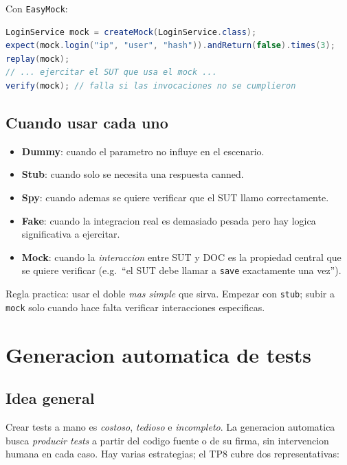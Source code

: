 \documentclass[12pt,a4paper]{article}
\begin{document}
\begin{ejemplobox}
Con \texttt{EasyMock}:
\begin{lstlisting}[style=codestyle,language=Java]
LoginService mock = createMock(LoginService.class);
expect(mock.login("ip", "user", "hash")).andReturn(false).times(3);
replay(mock);
// ... ejercitar el SUT que usa el mock ...
verify(mock); // falla si las invocaciones no se cumplieron
\end{lstlisting}
\end{ejemplobox}

\subsection{Cuando usar cada uno}

\begin{itemize}
  \item \textbf{Dummy}: cuando el parametro no influye en el escenario.
  \item \textbf{Stub}: cuando solo se necesita una respuesta canned.
  \item \textbf{Spy}: cuando ademas se quiere verificar que el SUT llamo correctamente.
  \item \textbf{Fake}: cuando la integracion real es demasiado pesada pero hay logica
  significativa a ejercitar.
  \item \textbf{Mock}: cuando la \emph{interaccion} entre SUT y DOC es la propiedad central
  que se quiere verificar (e.g.\ ``el SUT debe llamar a \texttt{save} exactamente una vez'').
\end{itemize}

\begin{ideabox}
Regla practica: usar el doble \emph{mas simple} que sirva. Empezar con \texttt{stub}; subir a
\texttt{mock} solo cuando hace falta verificar interacciones especificas.
\end{ideabox}

\section{Generacion automatica de tests}

\subsection{Idea general}

Crear tests a mano es \emph{costoso}, \emph{tedioso} e \emph{incompleto}. La generacion
automatica busca \emph{producir tests} a partir del codigo fuente o de su firma, sin
intervencion humana en cada caso. Hay varias estrategias; el TP8 cubre dos representativas:
\end{document}
